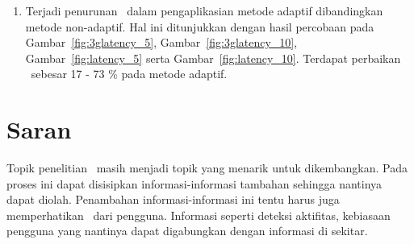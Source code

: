 \begin{enumerate}
  \item Terjadi penurunan \latency~dalam pengaplikasian metode adaptif
    dibandingkan metode non-adaptif. Hal ini ditunjukkan dengan hasil percobaan
    pada Gambar~\ref{fig:3glatency_5}, Gambar~\ref{fig:3glatency_10},
    Gambar~\ref{fig:latency_5} serta Gambar~\ref{fig:latency_10}. Terdapat
    perbaikan \latency~sebesar 17 - 73 \% pada metode adaptif.
\end{enumerate}


\section{Saran}

Topik penelitian \tracking~masih menjadi topik yang menarik untuk dikembangkan.
Pada proses ini dapat disisipkan informasi-informasi tambahan sehingga nantinya
dapat diolah. Penambahan informasi-informasi ini tentu harus juga memperhatikan
\privacy~dari pengguna. Informasi seperti deteksi aktifitas, kebiasaan pengguna
yang nantinya dapat digabungkan dengan informasi di sekitar.

